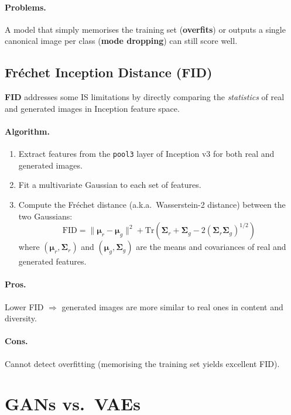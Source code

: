 \documentclass[11pt,a4paper]{article}
\theoremstyle{definition}
\theoremstyle{plain}
\theoremstyle{remark}
\begin{document}
\paragraph{Problems.} A model that simply memorises the training set (\textbf{overfits}) or outputs a single canonical image per class (\textbf{mode dropping}) can still score well.

\subsection{Fréchet Inception Distance (FID)}

\textbf{FID} addresses some IS limitations by directly comparing the \emph{statistics} of real and generated images in Inception feature space.

\paragraph{Algorithm.}
\begin{enumerate}
    \item Extract features from the \texttt{pool3} layer of Inception v3 for both real and generated images.
    \item Fit a multivariate Gaussian to each set of features.
    \item Compute the Fréchet distance (a.k.a.\ Wasserstein-2 distance) between the two Gaussians:
    \[
        \mathrm{FID} = \|\boldsymbol{\mu}_r - \boldsymbol{\mu}_g\|^2 + \mathrm{Tr}\!\left(\boldsymbol{\Sigma}_r + \boldsymbol{\Sigma}_g - 2(\boldsymbol{\Sigma}_r \boldsymbol{\Sigma}_g)^{1/2}\right)
    \]
    where $(\boldsymbol{\mu}_r, \boldsymbol{\Sigma}_r)$ and $(\boldsymbol{\mu}_g, \boldsymbol{\Sigma}_g)$ are the means and covariances of real and generated features.
\end{enumerate}

\paragraph{Pros.} Lower FID $\Rightarrow$ generated images are more similar to real ones in content and diversity.

\paragraph{Cons.} Cannot detect overfitting (memorising the training set yields excellent FID).


\section{GANs vs.\ VAEs}
\end{document}
